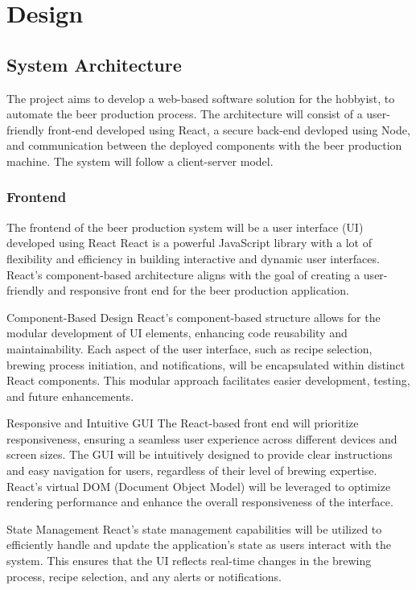 \section{Design}


\subsection{System Architecture}
The project aims to develop a web-based software solution for the hobbyist, to automate the beer production process. 
The architecture will consist of a user-friendly front-end developed using React, a secure back-end devloped using Node, and communication between the deployed components with the beer production machine. 
The system will follow a client-server model.

\subsubsection{Frontend}
The frontend of the beer production system will be a user interface (UI) developed using React
React is a powerful JavaScript library with a lot of flexibility and efficiency in building interactive and dynamic user interfaces. 
React's component-based architecture aligns with the goal of creating a user-friendly and responsive front end for the beer production application.

Component-Based Design
React's component-based structure allows for the modular development of UI elements, enhancing code reusability and maintainability. Each aspect of the user interface, such as recipe selection, brewing process initiation, and notifications, will be encapsulated within distinct React components. This modular approach facilitates easier development, testing, and future enhancements.

Responsive and Intuitive GUI
The React-based front end will prioritize responsiveness, ensuring a seamless user experience across different devices and screen sizes. The GUI will be intuitively designed to provide clear instructions and easy navigation for users, regardless of their level of brewing expertise. React's virtual DOM (Document Object Model) will be leveraged to optimize rendering performance and enhance the overall responsiveness of the interface.

State Management
React's state management capabilities will be utilized to efficiently handle and update the application's state as users interact with the system. This ensures that the UI reflects real-time changes in the brewing process, recipe selection, and any alerts or notifications.

